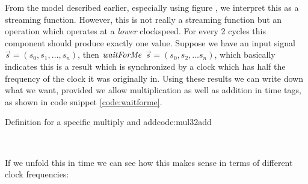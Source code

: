 From the model described earlier, especially using figure  , we interpret this as a streaming function.
However, this is not really a streaming function but an operation which operates at a \textit{lower} clockspeed. 
For every 2 cycles this component should produce exactly one value.
Suppose we have an input signal $\vec{s} = (s_0,s_1,\ldots,s_n)$, then \ensuremath{\Varid{waitForMe}} $\vec{s} = (s_0,s_2,\ldots s_n)$, which basically indicates this is a result which is synchronized by a clock which has half the frequency of the clock it was originally in.
Using these results we can write down what we want, provided we allow multiplication as well as addition in time tags, as shown in code snippet \ref{code:waitforme}.
\begin{texexptitled}{Definition for a specific multiply and add}{code:mul32add}
\begin{hscode}\SaveRestoreHook
{}%
%
\>[B]{}\mathbin{::}\langle{}\rangle\to {}\langle{}\mathbin{*}\rangle{}\<[E]%
\\
\>[B]{}\mathrel{=}\<[E]%
\ColumnHook
\end{hscode}\resethooks
\end{texexptitled}
If we unfold this in time we can see how this makes sense in terms of different clock frequencies:
\begin{figure}[H]
\centering
{}
\end{figure}

